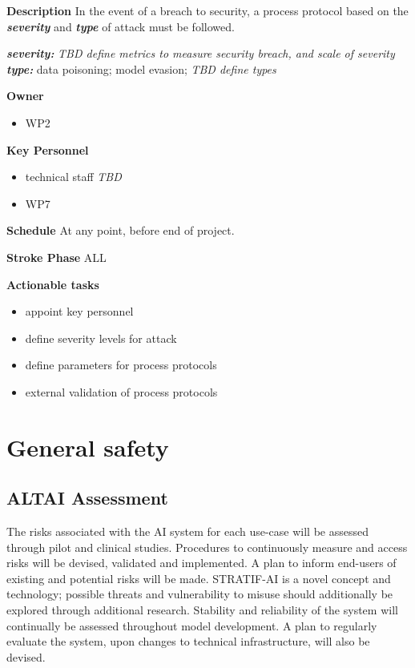 \documentclass[
  letterpaper,
  DIV=11,
  numbers=noendperiod]{scrreport}
\providecommand{\tightlist}{%
  \setlength{\itemsep}{0pt}\setlength{\parskip}{0pt}}\usepackage{longtable,booktabs,array}
\begin{document}
\textbf{Description} In the event of a breach to security, a process
protocol based on the \textbf{\emph{severity}} and \textbf{\emph{type}}
of attack must be followed.

\textbf{\emph{severity:}} \emph{TBD define metrics to measure security
breach, and scale of severity}\\
\textbf{\emph{type:}} data poisoning; model evasion; \emph{TBD define
types}

\textbf{Owner}

\begin{itemize}
\tightlist
\item
  WP2
\end{itemize}

\textbf{Key Personnel}

\begin{itemize}
\tightlist
\item
  technical staff \emph{TBD}
\item
  WP7
\end{itemize}

\textbf{Schedule} At any point, before end of project.

\textbf{Stroke Phase} ALL

\textbf{Actionable tasks}

\begin{itemize}
\tightlist
\item
  appoint key personnel
\item
  define severity levels for attack
\item
  define parameters for process protocols
\item
  external validation of process protocols
\end{itemize}

\hypertarget{general-safety}{%
\section{General safety}\label{general-safety}}

\hypertarget{altai-assessment-3}{%
\subsection*{ALTAI Assessment}\label{altai-assessment-3}}

The risks associated with the AI system for each use-case will be
assessed through pilot and clinical studies. Procedures to continuously
measure and access risks will be devised, validated and implemented. A
plan to inform end-users of existing and potential risks will be made.
STRATIF-AI is a novel concept and technology; possible threats and
vulnerability to misuse should additionally be explored through
additional research. Stability and reliability of the system will
continually be assessed throughout model development. A plan to
regularly evaluate the system, upon changes to technical infrastructure,
will also be devised.
\end{document}

